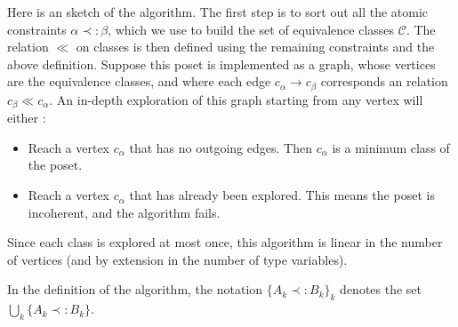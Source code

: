 \begin{defn}
  Here is an sketch of the algorithm.
  The first step is to sort out all the atomic constraints $\alpha \prec: \beta$, which we use to build the set of equivalence classes
  $\mathcal{C}$. The relation $\ll$ on classes is then defined using the remaining constraints and the above definition.
  Suppose this poset is implemented as a graph, whose vertices are the equivalence classes, and where each edge
  $c_\alpha \rightarrow c_\beta$ corresponds an relation $c_\beta \ll c_\alpha$. An in-depth exploration of this graph starting from any
  vertex will either :
  	\begin{itemize}
  		\item Reach a vertex $c_\alpha$ that has no outgoing edges. Then $c_\alpha$ is a minimum class of the poset.
  		\item Reach a vertex $c_\alpha$ that has already been explored. This means the poset is incoherent, and the algorithm fails.
  	\end{itemize}
  Since each class is explored at most once, this algorithm is linear in the number of vertices (and by extension in the number of type
  variables).
\end{defn}

In the definition of the algorithm, the notation $\{ A_k \prec: B_k \}_k$ denotes the set $\bigcup_{k} \{ A_k \prec: B_k \}$.

